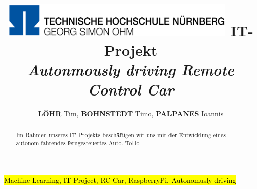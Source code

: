 \documentclass[journal]{IEEEtran}
\begin{document}
	
    \title{    
    \includegraphics[width=4.5in]{photo/logo.png}
    \newline \newline
     IT-Projekt \\ 
     \textit{Autonmously driving Remote Control Car}
     }

  \author{
      \textbf{L\"OHR} Tim,
      \textbf{BOHNSTEDT} Timo, 
      \textbf{PALPANES} Ioannis
}



\maketitle
\begin{abstract}
Im Rahmen unseres IT-Projekts beschäftigen wir uns mit der Entwicklung eines autonom fahrendes ferngesteuertes Auto. 
ToDo
\end{abstract}

\begin{IEEEkeywords}
\hl{Machine Learning, IT-Project, RC-Car, RaspberryPi, Autonomusly driving}
\end{IEEEkeywords}
\IEEEpeerreviewmaketitle

\end{document}
